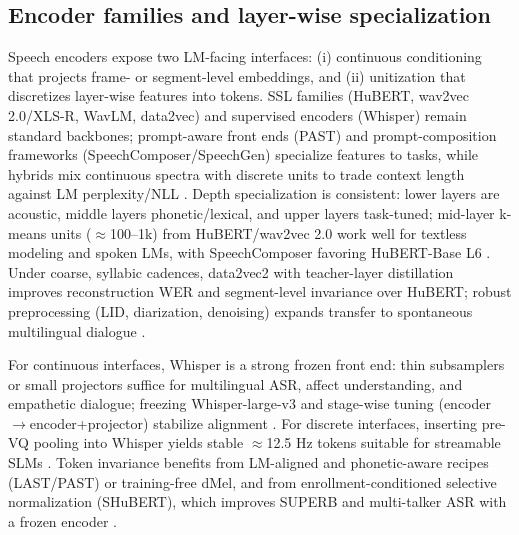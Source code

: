 \documentclass{article}
\begin{document}
\subsection{Encoder families and layer-wise specialization} \label{subsec:Encoder families and layer-wise specialization}
Speech encoders expose two LM-facing interfaces: (i) continuous conditioning that projects frame- or segment-level embeddings, and (ii) unitization that discretizes layer-wise features into tokens. SSL families (HuBERT, wav2vec 2.0/XLS-R, WavLM, data2vec) and supervised encoders (Whisper) remain standard backbones; prompt-aware front ends (PAST) and prompt-composition frameworks (SpeechComposer/SpeechGen) specialize features to tasks, while hybrids mix continuous spectra with discrete units to trade context length against LM perplexity/NLL \cite{har-tuv2025pastphoneticacousticspeechtokenizer,wu2024speechcomposerunifyingmultiplespeechtask,wu2023speechgenunlockinggenerativepowerspeechl,verma2024whispergpthybridrepresentationaudiolarge}. Depth specialization is consistent: lower layers are acoustic, middle layers phonetic/lexical, and upper layers task-tuned; mid-layer k-means units ($\approx$100--1k) from HuBERT/wav2vec 2.0 work well for textless modeling and spoken LMs, with SpeechComposer favoring HuBERT-Base L6 \cite{hsu2024exploringcontextlearningtextlessspeechla,wu2024speechcomposerunifyingmultiplespeechtask}. Under coarse, syllabic cadences, data2vec2 with teacher-layer distillation improves reconstruction WER and segment-level invariance over HuBERT; robust preprocessing (LID, diarization, denoising) expands transfer to spontaneous multilingual dialogue \cite{baade2024syllablelmlearningcoarsesemanticunitsspe,nakata2024jchatjapaneselargescalespokendialoguecor}.

For continuous interfaces, Whisper is a strong frozen front end: thin subsamplers or small projectors suffice for multilingual ASR, affect understanding, and empathetic dialogue; freezing Whisper-large-v3 and stage-wise tuning (encoder$\rightarrow$encoder+projector) stabilize alignment \cite{wang2024blspemotowardsempatheticlargespeechlangu,li2025transsionmultilingualspeechrecognitionsy,nguyen2025qwenvsgemmaintegrationwhispercomparative}. For discrete interfaces, inserting pre-VQ pooling into Whisper yields stable $\approx$12.5 Hz tokens suitable for streamable SLMs \cite{zeng2024scalingspeechtextpretrainingsyntheticint}. Token invariance benefits from LM-aligned and phonetic-aware recipes (LAST/PAST) or training-free dMel, and from enrollment-conditioned selective normalization (SHuBERT), which improves SUPERB and multi-talker ASR with a frozen encoder \cite{turetzky2024lastlanguagemodelawarespeechtokenization,har-tuv2025pastphoneticacousticspeechtokenizer,bai2025dmelspeechtokenizationmadesimple,entry2025selectivehubertselfsupervisedpretraining}.
\end{document}
